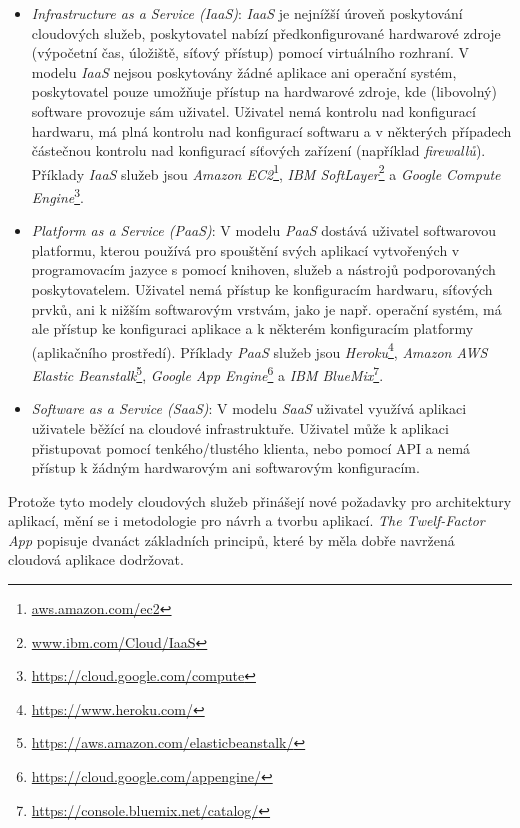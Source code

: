 \begin{itemize}
  \item{\textit{Infrastructure as a Service (IaaS)}}: \textit{IaaS} je nejnížší úroveň poskytování cloudových služeb, poskytovatel nabízí předkonfigurované hardwarové zdroje (výpočetní čas, úložiště, síťový přístup) pomocí virtuálního rozhraní. V modelu \textit{IaaS} nejsou poskytovány žádné aplikace ani operační systém, poskytovatel pouze umožňuje přístup na hardwarové zdroje, kde (libovolný) software provozuje sám uživatel. Uživatel nemá kontrolu nad konfigurací hardwaru, má plná kontrolu nad konfigurací softwaru a v některých případech částečnou kontrolu nad konfigurací síťových zařízení (například \textit{firewallů}). Příklady \textit{IaaS} služeb jsou \textit{Amazon EC2}\footnote{\url{aws.amazon.com/ec2}}, \textit{IBM SoftLayer}\footnote{\url{www.ibm.com/Cloud/IaaS}} a \textit{Google Compute Engine}\footnote{\url{https://cloud.google.com/compute}}.
  \item{\textit{Platform as a Service (PaaS)}}: V modelu \textit{PaaS} dostává uživatel softwarovou platformu, kterou používá pro spouštění svých aplikací vytvořených v programovacím jazyce s pomocí knihoven, služeb a nástrojů podporovaných poskytovatelem. Uživatel nemá přístup ke konfiguracím hardwaru, síťových prvků, ani k nižším softwarovým vrstvám, jako je např. operační systém, má ale přístup ke konfiguraci aplikace a k některém konfiguracím platformy (aplikačního prostředí). Příklady \textit{PaaS} služeb jsou \textit{Heroku}\footnote{\url{https://www.heroku.com/}}, \textit{Amazon AWS Elastic Beanstalk}\footnote{\url{https://aws.amazon.com/elasticbeanstalk/}}, \textit{Google App Engine}\footnote{\url{https://cloud.google.com/appengine/}} a \textit{IBM BlueMix}\footnote{\url{https://console.bluemix.net/catalog/}}.
  \item{\textit{Software as a Service (SaaS)}}: V modelu \textit{SaaS} uživatel využívá aplikaci uživatele běžící na cloudové infrastruktuře. Uživatel může k aplikaci přistupovat pomocí tenkého/tlustého klienta, nebo pomocí API a nemá přístup k žádným hardwarovým ani softwarovým konfiguracím.
\end{itemize}

Protože tyto modely cloudových služeb přinášejí nové požadavky pro architektury aplikací, mění se i metodologie pro návrh a tvorbu aplikací. \textit{The Twelf-Factor App} \cite{Wiggins17} popisuje dvanáct základních principů, které by měla dobře navržená cloudová aplikace dodržovat.

